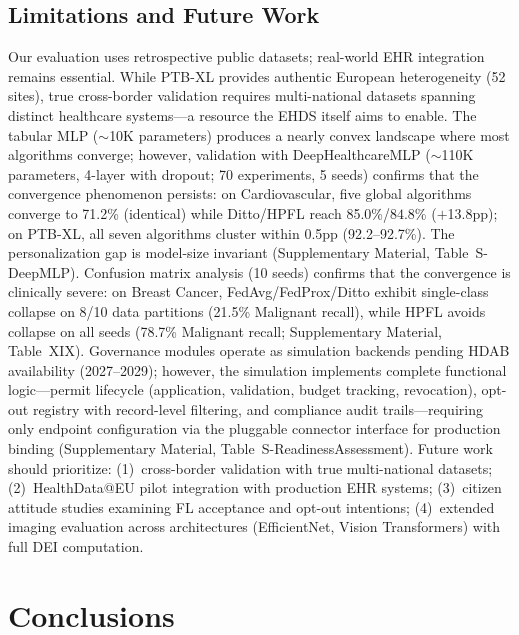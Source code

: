 \documentclass[conference,letterpaper]{IEEEtran}
\begin{document}
\subsection{Limitations and Future Work}

Our evaluation uses retrospective public datasets; real-world EHR integration remains essential. While PTB-XL provides authentic European heterogeneity (52 sites), true cross-border validation requires multi-national datasets spanning distinct healthcare systems---a resource the EHDS itself aims to enable. The tabular MLP ($\sim$10K parameters) produces a nearly convex landscape where most algorithms converge; however, validation with DeepHealthcareMLP ($\sim$110K parameters, 4-layer with dropout; 70 experiments, 5 seeds) confirms that the convergence phenomenon persists: on Cardiovascular, five global algorithms converge to 71.2\% (identical) while Ditto/HPFL reach 85.0\%/$84.8$\% ($+$13.8pp); on PTB-XL, all seven algorithms cluster within 0.5pp (92.2--92.7\%). The personalization gap is model-size invariant (Supplementary Material, Table~S-DeepMLP). Confusion matrix analysis (10 seeds) confirms that the convergence is clinically severe: on Breast Cancer, FedAvg/FedProx/Ditto exhibit single-class collapse on 8/10 data partitions (21.5\% Malignant recall), while HPFL avoids collapse on all seeds (78.7\% Malignant recall; Supplementary Material, Table~XIX). Governance modules operate as simulation backends pending HDAB availability (2027--2029); however, the simulation implements complete functional logic---permit lifecycle (application, validation, budget tracking, revocation), opt-out registry with record-level filtering, and compliance audit trails---requiring only endpoint configuration via the pluggable connector interface for production binding (Supplementary Material, Table~S-ReadinessAssessment). Future work should prioritize: (1)~cross-border validation with true multi-national datasets; (2)~HealthData@EU pilot integration with production EHR systems; (3)~citizen attitude studies examining FL acceptance and opt-out intentions; (4)~extended imaging evaluation across architectures (EfficientNet, Vision Transformers) with full DEI computation.

\section{Conclusions}
\label{sec:conclusions}
\end{document}

